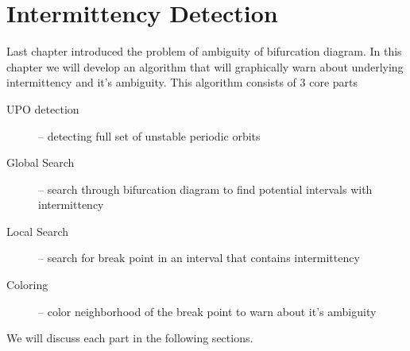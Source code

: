 \chapter{Intermittency Detection}
Last chapter introduced the problem of ambiguity of bifurcation diagram.
In this chapter we will develop an algorithm that will graphically warn about underlying intermittency and it's ambiguity.
This algorithm consists of 3 core parts

\begin{description}
    \item [UPO detection] -- detecting full set of unstable periodic orbits
	\item [Global Search] -- search through bifurcation diagram to find potential intervals with intermittency
	\item [Local Search] -- search for break point in an interval that contains intermittency
	\item [Coloring] -- color neighborhood of the break point to warn about it's ambiguity
\end{description}

We will discuss each part in the following sections.

